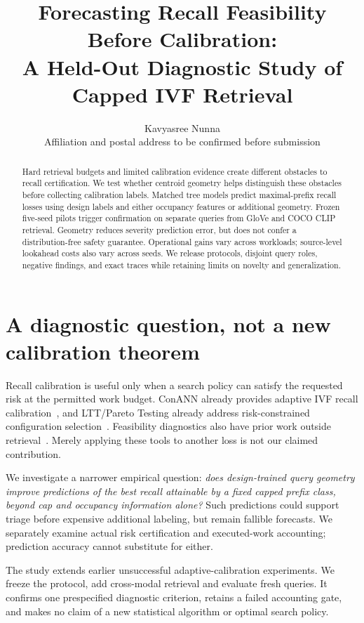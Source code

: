 \documentclass[a4paper,10pt]{esannV2}
\begin{document}
\title{Forecasting Recall Feasibility Before Calibration:\\A Held-Out Diagnostic Study of Capped IVF Retrieval}
\author{Kavyasree Nunna\vspace{.3cm}\\Affiliation and postal address to be confirmed before submission}
\maketitle
\begin{abstract}
Hard retrieval budgets and limited calibration evidence create different obstacles
to recall certification. We test whether centroid geometry helps distinguish
these obstacles before collecting calibration labels. Matched tree
models predict maximal-prefix recall losses using design labels and either
occupancy features or additional geometry. Frozen five-seed pilots trigger
confirmation on separate queries from GloVe and COCO CLIP retrieval. Geometry
reduces severity prediction error, but does not confer a distribution-free safety
guarantee. Operational gains vary across workloads; source-level lookahead costs
also vary across seeds. We release protocols, disjoint query roles, negative
findings, and exact traces while retaining limits on novelty and generalization.
\end{abstract}
\section{A diagnostic question, not a new calibration theorem}
Recall calibration is useful only when a search policy can satisfy the requested
risk at the permitted work budget. ConANN already provides adaptive IVF recall
calibration~\cite{conann}, and LTT/Pareto Testing already address risk-constrained
configuration selection~\cite{ltt,pareto}. Feasibility diagnostics also have prior
work outside retrieval~\cite{feasibility}. Merely applying these tools to another
loss is not our claimed contribution.

We investigate a narrower empirical question: \emph{does design-trained query
geometry improve predictions of the best recall attainable by a fixed capped
prefix class, beyond cap and occupancy information alone?} Such predictions
could support triage before expensive additional labeling, but remain fallible
forecasts. We separately examine actual risk certification and executed-work
accounting; prediction accuracy cannot substitute for either.

The study extends earlier unsuccessful adaptive-calibration experiments.
We freeze the protocol, add cross-modal retrieval and evaluate fresh queries.
It confirms one prespecified diagnostic criterion, retains a failed accounting
gate, and makes no claim of a new statistical algorithm or optimal search policy.
\end{document}
